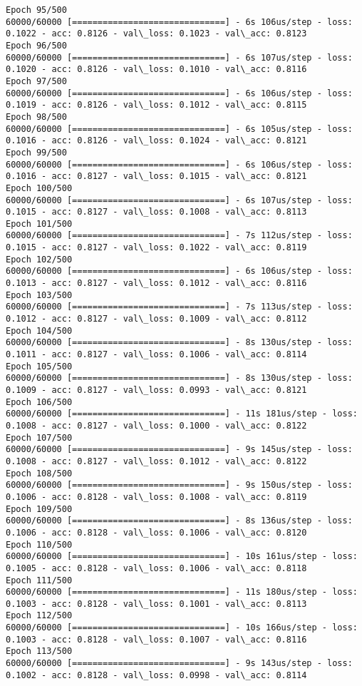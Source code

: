 \documentclass[11pt]{article}
\begin{document}
\begin{Verbatim}[commandchars=\\\{\}]
Epoch 95/500
60000/60000 [==============================] - 6s 106us/step - loss: 0.1022 - acc: 0.8126 - val\_loss: 0.1023 - val\_acc: 0.8123
Epoch 96/500
60000/60000 [==============================] - 6s 107us/step - loss: 0.1020 - acc: 0.8126 - val\_loss: 0.1010 - val\_acc: 0.8116
Epoch 97/500
60000/60000 [==============================] - 6s 106us/step - loss: 0.1019 - acc: 0.8126 - val\_loss: 0.1012 - val\_acc: 0.8115
Epoch 98/500
60000/60000 [==============================] - 6s 105us/step - loss: 0.1016 - acc: 0.8126 - val\_loss: 0.1024 - val\_acc: 0.8121
Epoch 99/500
60000/60000 [==============================] - 6s 106us/step - loss: 0.1016 - acc: 0.8127 - val\_loss: 0.1015 - val\_acc: 0.8121
Epoch 100/500
60000/60000 [==============================] - 6s 107us/step - loss: 0.1015 - acc: 0.8127 - val\_loss: 0.1008 - val\_acc: 0.8113
Epoch 101/500
60000/60000 [==============================] - 7s 112us/step - loss: 0.1015 - acc: 0.8127 - val\_loss: 0.1022 - val\_acc: 0.8119
Epoch 102/500
60000/60000 [==============================] - 6s 106us/step - loss: 0.1013 - acc: 0.8127 - val\_loss: 0.1012 - val\_acc: 0.8116
Epoch 103/500
60000/60000 [==============================] - 7s 113us/step - loss: 0.1012 - acc: 0.8127 - val\_loss: 0.1009 - val\_acc: 0.8112
Epoch 104/500
60000/60000 [==============================] - 8s 130us/step - loss: 0.1011 - acc: 0.8127 - val\_loss: 0.1006 - val\_acc: 0.8114
Epoch 105/500
60000/60000 [==============================] - 8s 130us/step - loss: 0.1009 - acc: 0.8127 - val\_loss: 0.0993 - val\_acc: 0.8121
Epoch 106/500
60000/60000 [==============================] - 11s 181us/step - loss: 0.1008 - acc: 0.8127 - val\_loss: 0.1000 - val\_acc: 0.8122
Epoch 107/500
60000/60000 [==============================] - 9s 145us/step - loss: 0.1008 - acc: 0.8127 - val\_loss: 0.1012 - val\_acc: 0.8122
Epoch 108/500
60000/60000 [==============================] - 9s 150us/step - loss: 0.1006 - acc: 0.8128 - val\_loss: 0.1008 - val\_acc: 0.8119
Epoch 109/500
60000/60000 [==============================] - 8s 136us/step - loss: 0.1006 - acc: 0.8128 - val\_loss: 0.1006 - val\_acc: 0.8120
Epoch 110/500
60000/60000 [==============================] - 10s 161us/step - loss: 0.1005 - acc: 0.8128 - val\_loss: 0.1006 - val\_acc: 0.8118
Epoch 111/500
60000/60000 [==============================] - 11s 180us/step - loss: 0.1003 - acc: 0.8128 - val\_loss: 0.1001 - val\_acc: 0.8113
Epoch 112/500
60000/60000 [==============================] - 10s 166us/step - loss: 0.1003 - acc: 0.8128 - val\_loss: 0.1007 - val\_acc: 0.8116
Epoch 113/500
60000/60000 [==============================] - 9s 143us/step - loss: 0.1002 - acc: 0.8128 - val\_loss: 0.0998 - val\_acc: 0.8114

\end{Verbatim}
\end{document}

